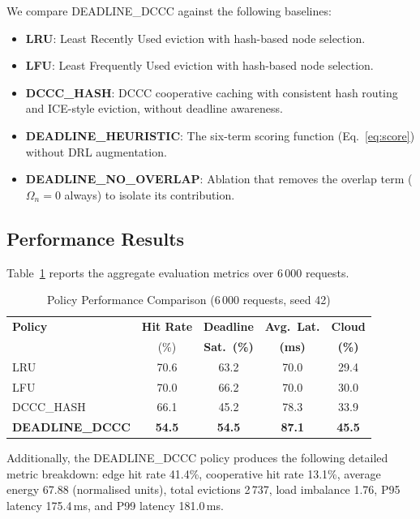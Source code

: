 \documentclass[conference]{IEEEtran}
\begin{document}
We compare DEADLINE\_DCCC against the following baselines:

\begin{itemize}
  \item \textbf{LRU}: Least Recently Used eviction with hash-based
    node selection.
  \item \textbf{LFU}: Least Frequently Used eviction with hash-based
    node selection.
  \item \textbf{DCCC\_HASH}: DCCC cooperative caching with consistent
    hash routing and ICE-style eviction, without deadline awareness.
  \item \textbf{DEADLINE\_HEURISTIC}: The six-term scoring function
    (Eq.~\ref{eq:score}) without DRL augmentation.
  \item \textbf{DEADLINE\_NO\_OVERLAP}: Ablation that removes the
    overlap term ($\Omega_n = 0$ always) to isolate its contribution.
\end{itemize}

\subsection{Performance Results}

Table~\ref{tab:results} reports the aggregate evaluation metrics over
6\,000 requests.

\begin{table}[t]
  \caption{Policy Performance Comparison (6\,000 requests, seed 42)}
  \label{tab:results}
  \renewcommand{\arraystretch}{1.2}
  \begin{tabular}{lcccc}
    \toprule
    \textbf{Policy} & \textbf{Hit Rate} & \textbf{Deadline} & \textbf{Avg.\ Lat.} & \textbf{Cloud} \\
    & (\%) & \textbf{Sat.\ (\%)} & \textbf{(ms)} & \textbf{(\%)} \\
    \midrule
    LRU            & 70.6 & 63.2 & 70.0  & 29.4 \\
    LFU            & 70.0 & 66.2 & 70.0  & 30.0 \\
    DCCC\_HASH     & 66.1 & 45.2 & 78.3  & 33.9 \\
    \textbf{DEADLINE\_DCCC} & \textbf{54.5} & \textbf{54.5} & \textbf{87.1} & \textbf{45.5} \\
    \bottomrule
  \end{tabular}
\end{table}

Additionally, the DEADLINE\_DCCC policy produces the following
detailed metric breakdown: edge hit rate 41.4\%, cooperative hit rate
13.1\%, average energy 67.88 (normalised units), total evictions
2\,737, load imbalance 1.76, P95 latency 175.4\,ms, and P99 latency
181.0\,ms.
\end{document}
